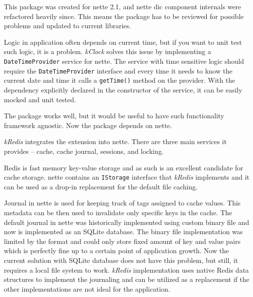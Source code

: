 This package was created for \gls{nette} 2.1, and \gls{nette} \gls{dic} component internals were refactored heavily since. This means the package has to be reviewed for possible problems and updated to current libraries.

 \label{sec:state:clock}

Logic in application often depends on current time, but if you want to unit test such logic, it is a problem. \textit{\gls{kClock}} solves this issue by implementing a \lstinline{DateTimeProvider} service for \gls{nette}. The service with time sensitive logic should require the \lstinline{DateTimeProvider} interface and every time it needs to know the current date and time it calls a \lstinline{getTime()} method on the provider. With the dependency explicitly declared in the constructor of the service, it can be easily mocked and unit tested.

The package works well, but it would be useful to have such functionality framework agnostic. Now the package depends on \gls{nette}.

 \label{sec:state:redis}

\textit{\gls{kRedis}} integrates the  extension  into \gls{nette}. There are three main services it provides -- cache, cache journal, sessions, and locking.

Redis is fast memory key-value storage and as such is an excellent candidate for cache storage. \gls{nette} contains an \lstinline{IStorage} interface that \textit{\gls{kRedis}} implements and it can be used as a drop-in replacement for the default file caching.

Journal in \gls{nette} is used for keeping track of tags assigned to cache values. This metadata can be then used to invalidate only specific keys in the cache. The default journal in \gls{nette} was historically implemented using custom binary file and now is implemented as an SQLite database. The binary file implementation was limited by the format and could only store fixed amount of key and value pairs which is perfectly fine up to a certain point of application growth. Now the current solution with SQLite database does not have this problem, but still, it requires a local file system to work. \textit{\gls{kRedis}} implementation uses native Redis data structures to implement the journaling and can be utilized as a replacement if the other implementations are not ideal for the application.

